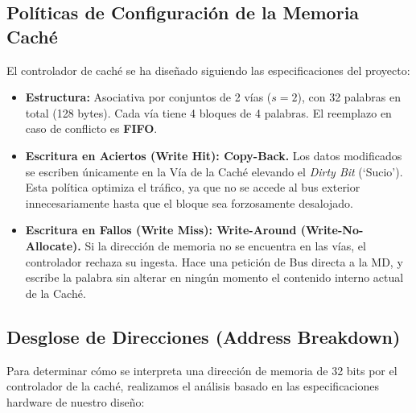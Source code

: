 \documentclass[12pt,a4paper]{article}
\begin{document}
\begin{center}
{%
    }
    \shorthandon{<>}
    \end{center}
    \bigskip

    \subsection{Políticas de Configuración de la Memoria Caché}

    El controlador de caché se ha diseñado siguiendo las especificaciones del proyecto:
    \begin{itemize}[leftmargin=1.5em]
    \item \textbf{Estructura:} Asociativa por conjuntos de 2 vías ($s=2$), con 32 palabras en total (128 bytes). Cada vía tiene 4 bloques de 4 palabras. El reemplazo en caso de conflicto es \textbf{FIFO}.
    \item \textbf{Escritura en Aciertos (Write Hit): Copy-Back.}
            Los datos modificados se escriben únicamente en la Vía de la Caché elevando el \textit{Dirty Bit} (`Sucio'). Esta política optimiza el tráfico, ya que no se accede al bus exterior innecesariamente hasta que el bloque sea forzosamente desalojado.
    \item \textbf{Escritura en Fallos (Write Miss): Write-Around (Write-No-Allocate).}
            Si la dirección de memoria no se encuentra en las vías, el controlador rechaza su ingesta. Hace una petición de Bus directa a la MD, y escribe la palabra sin alterar en ningún momento el contenido interno actual de la Caché.
    \end{itemize}

\subsection{Desglose de Direcciones (Address Breakdown)}

Para determinar cómo se interpreta una dirección de memoria de 32 bits por el controlador de la caché, realizamos el análisis basado en las especificaciones hardware de nuestro diseño:
\end{document}
